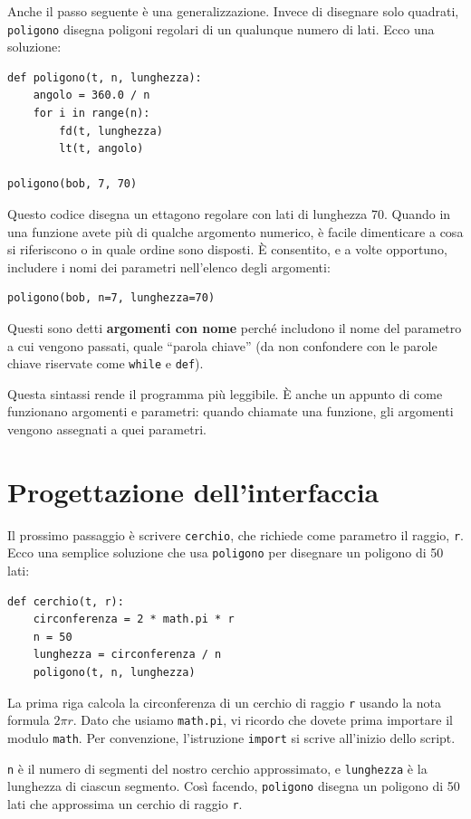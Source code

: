 \documentclass[10pt]{book}
\begin{document}
Anche il passo seguente è una generalizzazione. Invece di disegnare solo quadrati, {\tt poligono} disegna poligoni regolari di un qualunque numero di lati. Ecco una soluzione:

\begin{verbatim}
def poligono(t, n, lunghezza):
    angolo = 360.0 / n
    for i in range(n):
        fd(t, lunghezza)
        lt(t, angolo)

poligono(bob, 7, 70)
\end{verbatim}
%
Questo codice disegna un ettagono regolare con lati di lunghezza 70. Quando in una funzione avete più di qualche argomento numerico, è facile dimenticare a cosa si riferiscono o in quale ordine sono disposti. È consentito, e a volte opportuno, includere i nomi dei parametri nell'elenco degli argomenti:

\begin{verbatim}
poligono(bob, n=7, lunghezza=70)
\end{verbatim}
%
Questi sono detti {\bf argomenti con nome} perché includono il nome del parametro a cui vengono passati, quale ``parola chiave'' (da non confondere con le parole chiave riservate come {\tt while} e {\tt def}).

Questa sintassi rende il programma più leggibile. È anche un appunto di come funzionano argomenti e parametri: quando chiamate una funzione, gli argomenti vengono assegnati a quei parametri.


\section{Progettazione dell'interfaccia}

Il prossimo passaggio è scrivere {\tt cerchio}, che richiede come parametro il raggio, {\tt r}. Ecco una semplice soluzione che usa {\tt poligono} per disegnare un poligono di 50 lati:

\begin{verbatim}
def cerchio(t, r):
    circonferenza = 2 * math.pi * r
    n = 50
    lunghezza = circonferenza / n
    poligono(t, n, lunghezza)
\end{verbatim}
%
La prima riga calcola la circonferenza di un cerchio di raggio
{\tt r} usando la nota formula $2 \pi r$. Dato che usiamo {\tt math.pi}, vi ricordo che dovete prima importare il modulo {\tt math}.  Per convenzione, l'istruzione {\tt import} si scrive all'inizio dello script.

{\tt n} è il numero di segmenti del nostro cerchio approssimato, e {\tt lunghezza} è la lunghezza di ciascun segmento. Così facendo, {\tt poligono}
disegna un poligono di 50 lati che approssima un cerchio di raggio {\tt r}.
\end{document}
